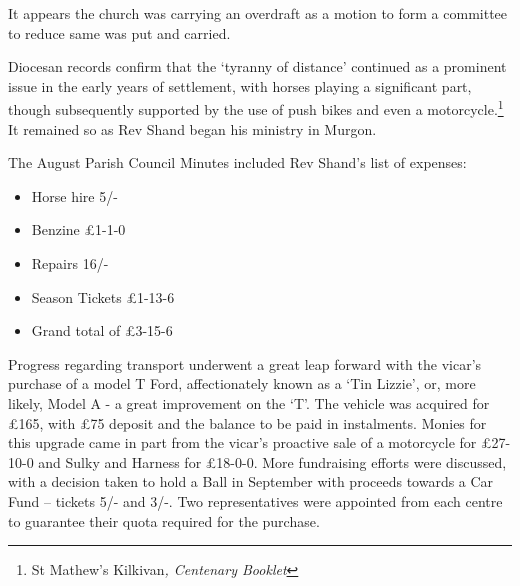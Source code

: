 \smallskip


It appears the church was carrying an overdraft as a motion to form a committee to reduce same was put and carried.



Diocesan records confirm that the `tyranny of distance' continued as a prominent issue in the early years of settlement, with horses playing a significant part, though subsequently supported by the use of push bikes and even a motorcycle.\footnote{St Mathew's Kilkivan\emph{, Centenary Booklet}} It remained so as Rev Shand began his ministry in Murgon.


The August Parish Council Minutes included Rev Shand's list of expenses:



\begin{itemize}

\item

  Horse hire 5/-

\item

  Benzine \pounds1-1-0

\item

  Repairs 16/-

\item

  Season Tickets \pounds1-13-6

\item

  Grand total of \pounds3-15-6

\end{itemize}



\smallskip


Progress regarding transport underwent a great leap forward with the vicar's purchase of a model T Ford, affectionately known as a `Tin Lizzie', or, more likely, Model A - a great improvement on the `T'. The vehicle was acquired for \pounds165, with \pounds75 deposit and the balance to be paid in instalments. Monies for this upgrade came in part from the vicar's proactive sale of a motorcycle for \pounds27-10-0 and Sulky and Harness for \pounds18-0-0. More fundraising efforts were discussed, with a decision taken to hold a Ball in September with proceeds towards a Car Fund -- tickets 5/- and 3/-. Two representatives were appointed from each centre to guarantee their quota required for the purchase.









